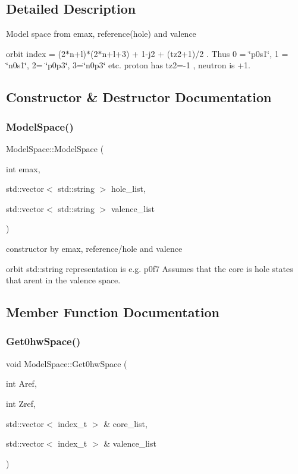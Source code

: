 \subsection{Detailed Description}
Model space from emax, reference(hole) and valence

orbit index = (2$\ast$n+l)$\ast$(2$\ast$n+l+3) + 1-\/j2 + (tz2+1)/2 . Thus 0 = \char`\"{}p0s1\char`\"{}, 1 = \char`\"{}n0s1\char`\"{}, 2= \char`\"{}p0p3\char`\"{}, 3=\char`\"{}n0p3\char`\"{} etc. proton has tz2=-\/1 , neutron is +1. 

\subsection{Constructor \& Destructor Documentation}
\mbox{\label{classModelSpace_a48d732fa9364d473f55d1ad0c1b5da60}} 
\subsubsection{\texorpdfstring{Model\+Space()}{ModelSpace()}}
{\footnotesize\ttfamily Model\+Space\+::\+Model\+Space (\begin{DoxyParamCaption}\item[{int}]{emax,  }\item[{std\+::vector$<$ std\+::string $>$}]{hole\+\_\+list,  }\item[{std\+::vector$<$ std\+::string $>$}]{valence\+\_\+list }\end{DoxyParamCaption})}



constructor by emax, reference/hole and valence 

orbit std\+::string representation is e.\+g. p0f7 Assumes that the core is hole states that aren\textquotesingle{}t in the valence space. 

\subsection{Member Function Documentation}
\mbox{\label{classModelSpace_ac572395f9cb05967fba8075328da8da3}} 
\subsubsection{\texorpdfstring{Get0hw\+Space()}{Get0hwSpace()}}
{\footnotesize\ttfamily void Model\+Space\+::\+Get0hw\+Space (\begin{DoxyParamCaption}\item[{int}]{Aref,  }\item[{int}]{Zref,  }\item[{std\+::vector$<$ index\+\_\+t $>$ \&}]{core\+\_\+list,  }\item[{std\+::vector$<$ index\+\_\+t $>$ \&}]{valence\+\_\+list }\end{DoxyParamCaption})}

